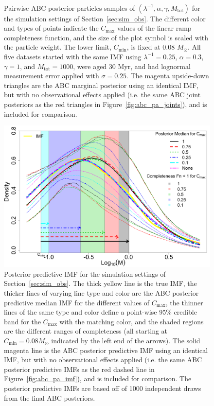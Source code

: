 \documentclass[ejs]{imsart}
\numberwithin{equation}{section}
\theoremstyle{plain}
\newcommand{\Msun}{M_{\odot}}
\newcommand{\Cmin}{C_{\text{min}}}
\newcommand{\Cmax}{C_{\text{max}}}
\newcommand{\Mtot}{M_{\text{tot}}}
\begin{document}
\begin{figure}[htbp]
\begin{subfigure}{0.32\textwidth}
\end{subfigure} \\
\caption{Pairwise ABC posterior particles samples of $(\lambda^{-1}, \alpha, \gamma, \Mtot)$ for the simulation settings of Section~\ref{sec:sim_obs}.  The different color and types of points indicate the $\Cmax$ values of the linear ramp completeness function, and the size of the plot symbol is scaled with the particle weight.  
The lower limit, $\Cmin$, is fixed at 0.08 $\Msun$.  
All five datasets started with the same IMF using $\lambda^{-1} = 0.25$, $\alpha = 0.3$, $\gamma = 1$, and $\Mtot = 1000$, were aged 30 Myr, and had lognormal measurement error applied with $\sigma = 0.25$.
The magenta upside-down triangles are the ABC marginal posterior using an identical IMF, but with no observational effects applied (i.e. the same ABC joint posteriors as the red triangles in Figure~\ref{fig:abc_pa_joints}), and is included for comparison.
}
\label{fig:abc_pa_joints_obs}
\end{figure}



\begin{figure}[htbp]
\centering
\includegraphics[width=.85\textwidth]{figures/obs_pred_imf.pdf}
 \caption{Posterior predictive IMF for the simulation settings of Section~\ref{sec:sim_obs}. 
The thick yellow line is the true IMF, the thicker lines of varying line type and color are the ABC posterior predictive median IMF for the different values of $\Cmax$, 
the thinner lines of the same type and color define a point-wise 95\% credible band  for the $\Cmax$ with the matching color, and
the shaded regions are the different ranges of completeness (all starting at $\Cmin = 0.08 \Msun$ indicated by the left end of the arrows).
The solid magenta line is the ABC posterior predictive IMF using an identical IMF, but with no observational effects applied (i.e. the same ABC posterior predictive IMFs as the red dashed line in Figure~\ref{fig:abc_pa_imf}), and is included for comparison.
The posterior predictive IMFs are based off of 1000 independent draws from the final ABC posteriors.  
} \label{fig:abc_pa_pred_obs}
\end{figure}
\end{document}
